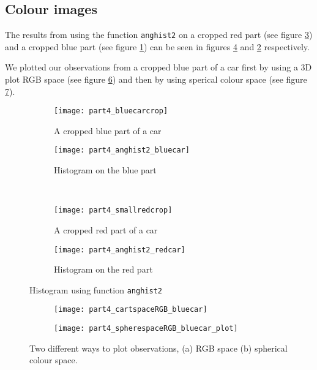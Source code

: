 \subsection{Colour images}
The results from using the function \texttt{anghist2} on a cropped red part (see figure \ref{fig:redCrop}) and a cropped blue part (see figure \ref{fig:blueCrop}) can be seen in figures \ref{fig:redSpec} and \ref{fig:blueSpec} respectively.

We plotted our observations from a cropped blue part of a car first by using a 3D plot RGB space (see figure \ref{fig:cartSpace}) and then by using sperical colour space (see figure \ref{fig:sphereSpace}).
\begin{figure}
	\centering
	\begin{subfigure}[b]{0.4\textwidth}
		\texttt{[image: part4\_bluecarcrop]}
		\caption{A cropped blue part of a car}
		\label{fig:blueCrop}
	\end{subfigure}
	\begin{subfigure}[b]{0.4\textwidth}
		\texttt{[image: part4\_anghist2\_bluecar]}
		\caption{Histogram on the blue part}
		\label{fig:blueSpec}
	\end{subfigure}
	\\
	\begin{subfigure}[b]{0.4\textwidth}
		\texttt{[image: part4\_smallredcrop]}
		\caption{A cropped red part of a car}
		\label{fig:redCrop}
	\end{subfigure}
	\begin{subfigure}[b]{0.4\textwidth}
		\texttt{[image: part4\_anghist2\_redcar]}
		\caption{Histogram on the red part}
		\label{fig:redSpec}
	\end{subfigure}
	\caption{Histogram using function \texttt{anghist2}}
	\label{fig:colour}
\end{figure}
\begin{figure}

	\centering
	\begin{subfigure}[b]{0.4\textwidth}
		\texttt{[image: part4\_cartspaceRGB\_bluecar]}
		\caption{}
		\label{fig:cartSpace}
	\end{subfigure}
	\begin{subfigure}[b]{0.4\textwidth}	
		\texttt{[image: part4\_spherespaceRGB\_bluecar\_plot]}
		\caption{}
		\label{fig:sphereSpace}
	\end{subfigure}
	\caption{Two different ways to plot observations, (a) RGB space (b) spherical colour space. }
	\label{fig:part4Sphere}
\end{figure}

